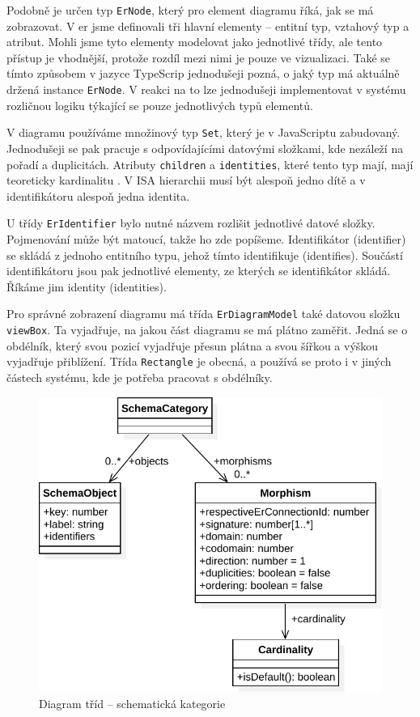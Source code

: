 Podobně je určen typ \texttt{ErNode}, který pro element diagramu říká, jak se má zobrazovat.
V \acrshort{er} jsme definovali tři hlavní elementy -- entitní typ, vztahový typ a atribut.
Mohli jsme tyto elementy modelovat jako jednotlivé třídy, ale tento přístup je vhodnější, protože rozdíl mezi nimi je pouze ve vizualizaci.
Také se tímto způsobem v jazyce TypeScrip jednodušeji pozná, o jaký typ má aktuálně držená instance \texttt{ErNode}.
V reakci na to lze jednodušeji implementovat v systému rozličnou logiku týkající se pouze jednotlivých typů elementů.

V diagramu používáme množinový typ \texttt{Set}, který je v JavaScriptu zabudovaný.
Jednodušeji se pak pracuje s odpovídajícími datovými složkami, kde nezáleží na pořadí a duplicitách.
Atributy \texttt{children} a \texttt{identities}, které tento typ mají, mají teoreticky kardinalitu \onemany{}.
V ISA hierarchii musí být alespoň jedno dítě a v identifikátoru alespoň jedna identita.

U třídy \texttt{ErIdentifier} bylo nutné názvem rozlišit jednotlivé datové složky.
Pojmenování může být matoucí, takže ho zde popíšeme.
Identifikátor (identifier) se skládá z jednoho entitního typu, jehož tímto identifikuje (identifies).
Součástí identifikátoru jsou pak jednotlivé elementy, ze kterých se identifikátor skládá.
Říkáme jim identity (identities).

Pro správné zobrazení diagramu má třída \texttt{ErDiagramModel} také datovou složku \texttt{viewBox}.
Ta vyjadřuje, na jakou část diagramu se má plátno zaměřit.
Jedná se o obdélník, který svou pozicí vyjadřuje přesun plátna a svou šířkou a výškou vyjadřuje přiblížení.
Třída \texttt{Rectangle} je obecná, a používá se proto i v jiných částech systému, kde je potřeba pracovat s obdélníky.


\begin{figure}[!htb]
  \centering
  \includegraphics[width=\maxwidth{\textwidth}]{../img/diagrams/schemcat-class-diagram.pdf}
  \caption{Diagram tříd -- schematická kategorie}
  \label{fig:schemcat-class-diagram}
\end{figure}

